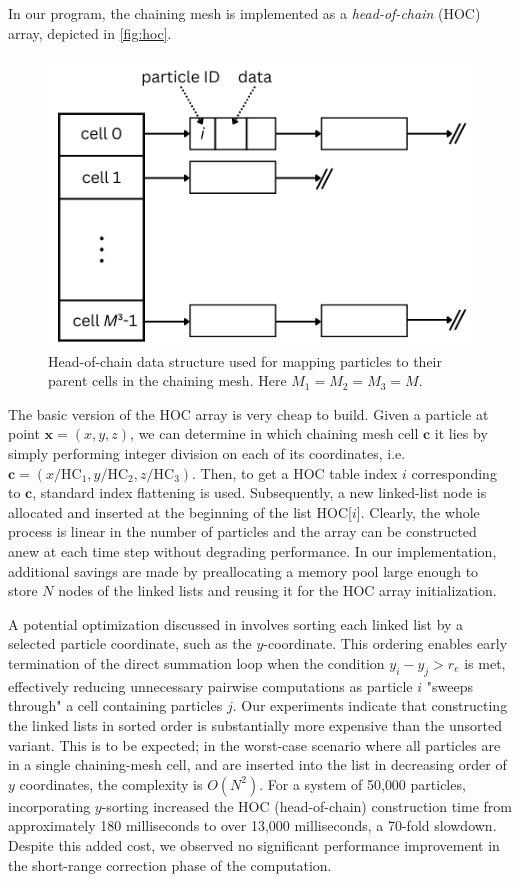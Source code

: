 In our program, the chaining mesh is implemented as a \textit{head-of-chain} (HOC) array, depicted in \autoref{fig:hoc}.
\begin{figure}[htp]
    \centering
    \includegraphics[scale=0.25]{img/hoc.png}
    \caption{Head-of-chain data structure used for mapping particles to their parent cells in the chaining mesh.
        Here $M_1=M_2=M_3 = M$.}
    \label{fig:hoc}
\end{figure}
The basic version of the HOC array is very cheap to build.
Given a particle at point $\mathbf{x} = (x, y, z)$, we can determine in which chaining mesh cell $\mathbf{c}$ it lies by simply performing integer division on each of its coordinates, i.e. $\mathbf{c} = (x / \text{HC}_1, y / \text{HC}_2, z / \text{HC}_3)$.
Then, to get a HOC table index $i$ corresponding to $\mathbf{c}$, standard index flattening is used.
Subsequently, a new linked-list node is allocated and inserted at the beginning of the list HOC[$i$].
Clearly, the whole process is linear in the number of particles and the array can be constructed anew at each time step without degrading performance.
In our implementation, additional savings are made by preallocating a memory pool large enough to store $N$ nodes of the linked lists and reusing it for the HOC array initialization.

A potential optimization discussed in \cite{Hockney1988} involves sorting each linked list by a selected particle coordinate, such as the $y$-coordinate.
This ordering enables early termination of the direct summation loop when the condition $y_i - y_j > r_e$ is met, effectively reducing unnecessary pairwise computations as particle $i$ "sweeps through" a cell containing particles $j$.
Our experiments indicate that constructing the linked lists in sorted order is substantially more expensive than the unsorted variant.
This is to be expected; in the worst-case scenario where all particles are in a single chaining-mesh cell, and are inserted into the list in decreasing order of $y$ coordinates, the complexity is $O(N^2)$.
For a system of 50{,}000 particles, incorporating $y$-sorting increased the HOC (head-of-chain) construction time from approximately 180 milliseconds to over 13{,}000 milliseconds, a 70-fold slowdown.
Despite this added cost, we observed no significant performance improvement in the short-range correction phase of the computation.


